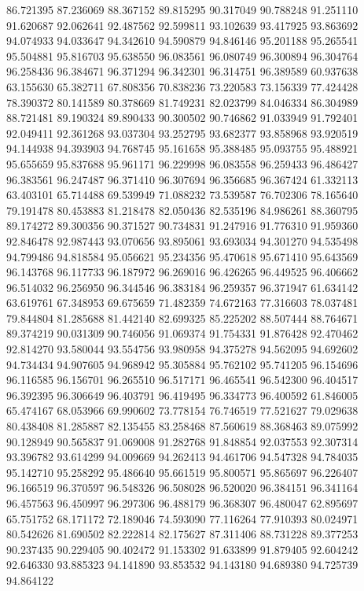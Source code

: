 86.721395
87.236069
88.367152
89.815295
90.317049
90.788248
91.251110
91.620687
92.062641
92.487562
92.599811
93.102639
93.417925
93.863692
94.074933
94.033647
94.342610
94.590879
94.846146
95.201188
95.265541
95.504881
95.816703
95.638550
96.083561
96.080749
96.300894
96.304764
96.258436
96.384671
96.371294
96.342301
96.314751
96.389589
60.937638
63.155630
65.382711
67.808356
70.838236
73.220583
73.156339
77.424428
78.390372
80.141589
80.378669
81.749231
82.023799
84.046334
86.304989
88.721481
89.190324
89.890433
90.300502
90.746862
91.033949
91.792401
92.049411
92.361268
93.037304
93.252795
93.682377
93.858968
93.920519
94.144938
94.393903
94.768745
95.161658
95.388485
95.093755
95.488921
95.655659
95.837688
95.961171
96.229998
96.083558
96.259433
96.486427
96.383561
96.247487
96.371410
96.307694
96.356685
96.367424
61.332113
63.403101
65.714488
69.539949
71.088232
73.539587
76.702306
78.165640
79.191478
80.453883
81.218478
82.050436
82.535196
84.986261
88.360795
89.174272
89.300356
90.371527
90.734831
91.247916
91.776310
91.959360
92.846478
92.987443
93.070656
93.895061
93.693034
94.301270
94.535498
94.799486
94.818584
95.056621
95.234356
95.470618
95.671410
95.643569
96.143768
96.117733
96.187972
96.269016
96.426265
96.449525
96.406662
96.514032
96.256950
96.344546
96.383184
96.259357
96.371947
61.634142
63.619761
67.348953
69.675659
71.482359
74.672163
77.316603
78.037481
79.844804
81.285688
81.442140
82.699325
85.225202
88.507444
88.764671
89.374219
90.031309
90.746056
91.069374
91.754331
91.876428
92.470462
92.814270
93.580044
93.554756
93.980958
94.375278
94.562095
94.692602
94.734434
94.907605
94.968942
95.305884
95.762102
95.741205
96.154696
96.116585
96.156701
96.265510
96.517171
96.465541
96.542300
96.404517
96.392395
96.306649
96.403791
96.419495
96.334773
96.400592
61.846005
65.474167
68.053966
69.990602
73.778154
76.746519
77.521627
79.029638
80.438408
81.285887
82.135455
83.258468
87.560619
88.368463
89.075992
90.128949
90.565837
91.069008
91.282768
91.848854
92.037553
92.307314
93.396782
93.614299
94.009669
94.262413
94.461706
94.547328
94.784035
95.142710
95.258292
95.486640
95.661519
95.800571
95.865697
96.226407
96.166519
96.370597
96.548326
96.508028
96.520020
96.384151
96.341164
96.457563
96.450997
96.297306
96.488179
96.368307
96.480047
62.895697
65.751752
68.171172
72.189046
74.593090
77.116264
77.910393
80.024971
80.542626
81.690502
82.222814
82.175627
87.311406
88.731228
89.377253
90.237435
90.229405
90.402472
91.153302
91.633899
91.879405
92.604242
92.646330
93.885323
94.141890
93.853532
94.143180
94.689380
94.725739
94.864122
